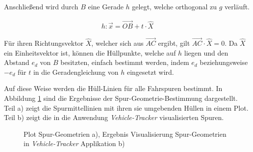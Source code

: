 Anschließend wird durch $B$ eine Gerade $h$ gelegt, welche orthogonal zu $g$ verläuft.

\begin{ceqn}
\begin{align}
    h: \vec{x} = \overrightarrow{OB} + t \cdot \hat{X}
\end{align}
\end{ceqn}

Für ihren Richtungsvektor $\hat{X}$, welcher sich aus $\overrightarrow{AC}$ ergibt, gilt
$\overrightarrow{AC} \cdot \hat{X} = 0$. Da $\hat{X}$ ein Einheitsvektor
ist, können die Hüllpunkte, welche auf $h$ liegen und den Abstand $e_d$ von $B$ besitzten, einfach
bestimmt werden, indem $e_d$ beziehungsweise $-e_d$ für $t$ in die Geradengleichung von $h$ eingesetzt wird.

Auf diese Weise werden die Hüll-Linien für alle Fahrspuren bestimmt. In Abbildung \ref{fig:real2_results_geometry_definition} sind die
Ergebnisse der Spur-Geometrie-Bestimmung dargestellt. Teil a) zeigt die Spurmittellinien mit ihren
sie umgebenden Hüllen in einem Plot. Teil b) zeigt die in die Anwendung \textit{Vehicle-Tracker} visualisierten Spuren.

\begin{figure}[H]
    \centering
    \caption[Ergebnisse Spur-Geometrie-Bestimmung]
            {Plot Spur-Geometrien a), Ergebnis Visualisierung Spur-Geometrien in \textit{Vehicle-Tracker} Applikation b)}
    \label{fig:real2_results_geometry_definition}
\end{figure}

